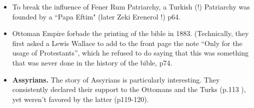 \documentclass[a4paper]{book}
\begin{document}
\begin{itemize}
\item To break the influence of Fener Rum Patriarchy, a Turkish (!) Patriarchy was founded by a ``Papa Eftim" (later Zeki Erenerol !) p64.
\item Ottoman Empire forbade the printing of the bible in 1883. (Technically, they first asked a Lewis Wallace to add to the front page the note ``Only for the usage of Protestants'', which he refused to do saying that this was something that was never done in the history of the bible, p74.
\item \textbf{Assyrians.} The story of Assyrians is particularly interesting. They consistently declared their support to the Ottomans and the Turks (p.113 ), yet weren't favored by the latter (p119-120).
\end{itemize}






\end{document}
